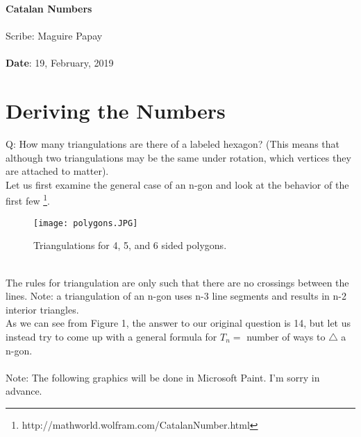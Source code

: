 \documentclass[11pt,twosided]{article}
\def\titlestring{Catalan Numbers}
\def\scribestring{Maguire Papay}
\def\datestring{19, February, 2019}
\begin{document}
\thispagestyle{plain}  %

\noindent
{\LARGE \textbf{\titlestring}}\\\\
%
{\Large Scribe: \scribestring}\\ \\
{\textbf{Date}: \datestring}


\noindent

\section{Deriving the Numbers}
Q: How many triangulations are there of a labeled hexagon? (This means that although two triangulations may be the same under rotation, which vertices they are attached to matter).\\
Let us first examine the general case of an n-gon and look at the behavior of the first few \footnote{http://mathworld.wolfram.com/CatalanNumber.html}.\\
\begin{figure}[h]
  \texttt{[image: polygons.JPG]}
  \caption{Triangulations for 4, 5, and 6 sided polygons.}
  \label{fig:triangs1}
\end{figure}\\
The rules for triangulation are only such that there are no crossings between the lines. Note: a triangulation of an n-gon uses n-3 line segments and results in n-2 interior triangles.\\
As we can see from Figure 1, the answer to our original question is 14, but let us instead try to come up with a general formula for $T_n = $ number of ways to $\triangle$ a n-gon.\\
\\
Note: The following graphics will be done in Microsoft Paint. I'm sorry in advance.\\
\end{document}
